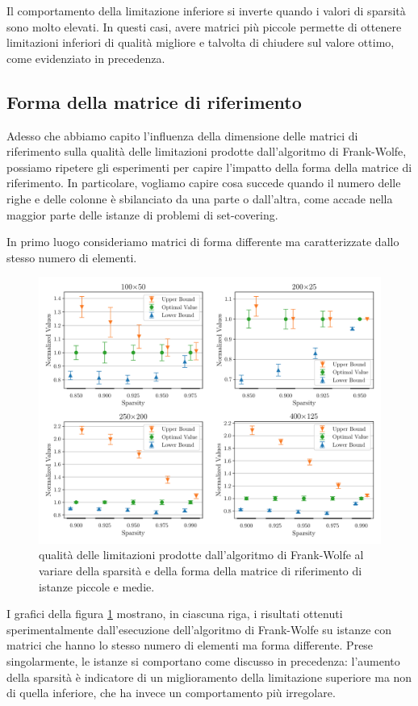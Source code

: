 \noindent
Il comportamento della limitazione inferiore si inverte quando i valori di sparsità sono molto elevati. In questi casi,
avere matrici più piccole permette di ottenere limitazioni inferiori di qualità migliore e talvolta di chiudere sul
valore ottimo, come evidenziato in precedenza.

\subsection{Forma della matrice di riferimento}
Adesso che abbiamo capito l’influenza della dimensione delle matrici di riferimento sulla qualità delle limitazioni
prodotte dall’algoritmo di Frank-Wolfe, possiamo ripetere gli esperimenti per capire l’impatto della forma della matrice
di riferimento. In particolare, vogliamo capire cosa succede quando il numero delle righe e delle colonne è sbilanciato
da una parte o dall’altra, come accade nella maggior parte delle istanze di problemi di set-covering.

In primo luogo consideriamo matrici di forma differente ma caratterizzate dallo stesso numero di elementi.

\begin{figure}[ht]
    \centering
    \includegraphics[width=\textwidth]{assets/figures/shape1.pdf}
    \caption{qualità delle limitazioni prodotte dall’algoritmo di Frank-Wolfe al variare della sparsità e della forma
    della matrice di riferimento di istanze piccole e medie.}
    \label{fig:shape1}
\end{figure}

\noindent
I grafici della figura \ref{fig:shape1} mostrano, in ciascuna riga, i risultati ottenuti sperimentalmente dall’esecuzione
dell’algoritmo di Frank-Wolfe su istanze con matrici che hanno lo stesso numero di elementi ma forma differente. Prese
singolarmente, le istanze si comportano come discusso in precedenza: l’aumento della sparsità è indicatore di un
miglioramento della limitazione superiore ma non di quella inferiore, che ha invece un comportamento più irregolare.

